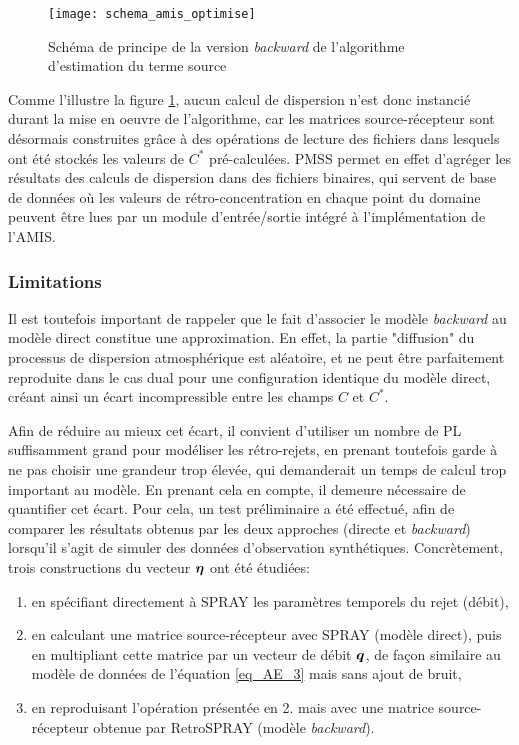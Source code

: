 \begin{figure}[h!]
	\centering
	\texttt{[image: schema\_amis\_optimise]}
	\caption{Schéma de principe de la version \textit{backward} de l'algorithme d'estimation du terme source}
	\label{fig_schema_amis_optimise}
\end{figure}

Comme l'illustre la figure \ref{fig_schema_amis_optimise}, aucun calcul de dispersion n'est donc instancié durant la mise en oeuvre de l'algorithme, car les matrices source-récepteur sont désormais construites grâce à des opérations de lecture des fichiers dans lesquels ont été stockés les valeurs de $C^*$ pré-calculées. PMSS permet en effet d'agréger les résultats des calculs de dispersion dans des fichiers binaires, qui servent de base de données où les valeurs de rétro-concentration en chaque point du domaine peuvent être lues par un module d'entrée/sortie intégré à l'implémentation de l'AMIS.

\subsubsection{Limitations}

Il est toutefois important de rappeler que le fait d'associer le modèle \textit{backward} au modèle direct constitue une approximation. En effet, la partie "diffusion" du processus de dispersion atmosphérique est aléatoire, et ne peut être parfaitement reproduite dans le cas dual pour une configuration identique du modèle direct, créant ainsi un écart incompressible entre les champs $C$ et $C^*$. 

Afin de réduire au mieux cet écart, il convient d'utiliser un nombre de PL suffisamment grand pour modéliser les rétro-rejets, en prenant toutefois garde à ne pas choisir une grandeur trop élevée, qui demanderait un temps de calcul trop important au modèle. En prenant cela en compte, il demeure nécessaire de quantifier cet écart. Pour cela, un test préliminaire a été effectué, afin de comparer les résultats obtenus par les deux approches (directe et \textit{backward}) lorsqu'il s'agit de simuler des données d'observation synthétiques. Concrètement, trois constructions du vecteur ${\bm{\eta}}$ ont été étudiées:

\begin{enumerate}
	\item en spécifiant directement à SPRAY les paramètres temporels du rejet (débit),
	\item en calculant une matrice source-récepteur avec SPRAY (modèle direct), puis en multipliant cette matrice par un vecteur de débit ${\bm{q}}$, de façon similaire au modèle de données de l'équation \eqref{eq_AE_3} mais sans ajout de bruit,
	\item en reproduisant l'opération présentée en 2. mais avec une matrice source-récepteur obtenue par RetroSPRAY (modèle \textit{backward}).
\end{enumerate} 

